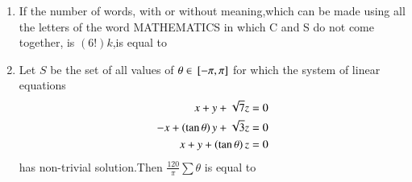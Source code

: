 \documentclass[journal]{IEEEtran}
\numberwithin{equation}{enumi}
\numberwithin{figure}{enumi}
\begin{document}
\begin{enumerate}
\begin{enumerate}
              \end{enumerate}     
              \item  If the number of words, with or without meaning,which can be made using all the letters of the word MATHEMATICS in which C and S do not come together, is $(6!)k$,is equal to      
        \hfill{}\\
       \begin{enumerate}    
              \end{enumerate}    

    \item Let $S$ be the set of all values of $\theta \in {}\left[-\pi,\pi\right]$ for which the system of linear equations \begin{align}
        x+y+\sqrt{7}z=0 \\
         -x+\left(\tan{\theta}\right)y+\sqrt{3}z=0 \\
          x+y+\left(\tan{\theta}\right)z=0 
    \end{align}
    has non-trivial solution.Then $\frac{120}{\pi}\sum \theta$ is equal to
        \hfill{}\\
       \begin{enumerate}    
              \end{enumerate}    


\end{enumerate}
\end{document}
